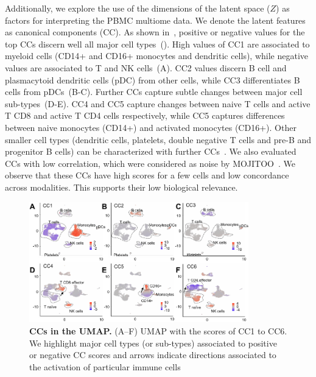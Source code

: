 Additionally, we explore the use of the dimensions of the latent space ($Z$) as factors for interpreting the PBMC multiome data. We denote the latent features as canonical components (CC). As shown in~, positive or negative values for the top CCs discern well all major cell types~(). High values of CC1 are associated to myeloid cells (CD14+ and CD16+ monocytes and dendritic cells), while negative values are associated to T and NK cells~(A). CC2 values discern B cell and plasmacytoid dendritic cells (pDC) from other cells, while CC3 differentiates B cells from pDCs~(B-C). Further CCs capture subtle changes between major cell sub-types~(D-E). CC4 and CC5 capture changes between naive T cells and active T CD8 and active T CD4 cells respectively, while CC5 captures differences between naive monocytes (CD14+) and activated monocytes (CD16+). Other smaller cell types (dendritic cells, platelets, double negative T cells and pre-B and progenitor B cells) can be characterized with further CCs~. We also evaluated CCs with low correlation, which were considered as noise by MOJITOO~. We observe that these CCs have high scores for a few cells and low concordance across modalities. This supports their low biological relevance.


\begin{figure}[!h]
	\centering
	\includegraphics[width=0.85\textwidth]{CC_UMAP/fig}
	\vspace{0.1cm}
	\caption[CCs in the UMAP.]{\textbf{CCs in the UMAP.} (A–F) UMAP with the scores of CC1 to CC6. We highlight major cell types (or sub-types) associated to positive or negative CC scores and arrows indicate directions associated to the activation of particular immune cells}
	\label{fig:CC_UMAP}
\end{figure}


